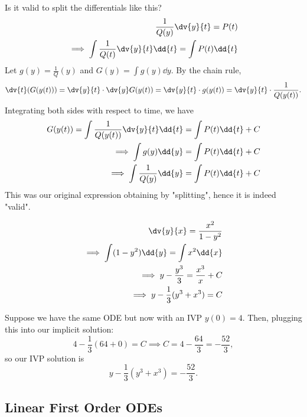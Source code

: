 \begin{remark}
    Is it valid to split the differentials like this? 
    \begin{align*}
        \frac{1}{Q(y)}\dv{y}{t} = P(t)\\
        \implies \int \frac{1}{Q(t)} \dv{y}{t} \dd{t} = \int P(t) \dd{t}
    \end{align*}
    Let $g(y) = \frac{1}{Q}(y)$ and $G(y) = \int g(y) \dd{y}$. By the chain rule, $$\dv{t}(G(y(t))) = \dv{y}{t}\cdot \dv{y}G(y(t)) = \dv{y}{t} \cdot g(y(t)) = \dv{y}{t}\cdot \frac{1}{Q(y(t))}.$$ Integrating both sides with respect to time, we have \begin{align*}
        G(y(t)) = \int \frac{1}{Q(y(t))} \dv{y}{t} \dd{t} = \int P(t)\dd{t} + C\\
        \implies \int g(y)\dd{y} = \int P(t) \dd{t} + C\\
        \implies \int \frac{1}{Q(y)} \dd{y} = \int P(t) \dd{t} + C
    \end{align*}
    This was our original expression obtaining by "splitting", hence it is indeed "valid".
\end{remark}

\begin{example}
    \begin{align*}
        \dv{y}{x} = \frac{x^2}{1-y^2}\\
        \implies \int (1 - y^2) \dd{y} = \int x^2 \dd{x}\\
        \implies y - \frac{y^3}{3} = \frac{x^3}{x} + C\\
        \implies y - \frac{1}{3}(y^3 + x^3) = C
    \end{align*}

    Suppose we have the same ODE but now with an IVP $y(0) = 4$. Then, plugging this into our implicit solution:
    \[
    4 - \frac{1}{3}(64 + 0) =C \implies C = 4 - \frac{64}{3} = - \frac{52}{3},    
    \]
    so our IVP solution is \[
    y - \frac{1}{3}(y^3 + x^3) = - \frac{52}{3}.    
    \]
\end{example}

\subsection{Linear First Order ODEs}


